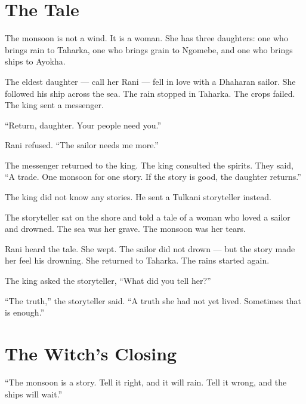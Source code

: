 \documentclass[10pt,twoside]{book}
\begin{document}
\section*{The Tale}
The monsoon is not a wind. It is a woman. She has three daughters: one who brings rain to Taharka, one who brings grain to Ngomebe, and one who brings ships to Ayokha.

The eldest daughter --- call her Rani --- fell in love with a Dhaharan sailor. She followed his ship across the sea. The rain stopped in Taharka. The crops failed. The king sent a messenger.

``Return, daughter. Your people need you.''

Rani refused. ``The sailor needs me more.''

The messenger returned to the king. The king consulted the spirits. They said, ``A trade. One monsoon for one story. If the story is good, the daughter returns.''

The king did not know any stories. He sent a Tulkani storyteller instead.

The storyteller sat on the shore and told a tale of a woman who loved a sailor and drowned. The sea was her grave. The monsoon was her tears.

Rani heard the tale. She wept. The sailor did not drown --- but the story made her feel his drowning. She returned to Taharka. The rains started again.

The king asked the storyteller, ``What did you tell her?''

``The truth,'' the storyteller said. ``A truth she had not yet lived. Sometimes that is enough.''

\section*{The Witch's Closing}
``The monsoon is a story. Tell it right, and it will rain. Tell it wrong, and the ships will wait.''
\end{document}
